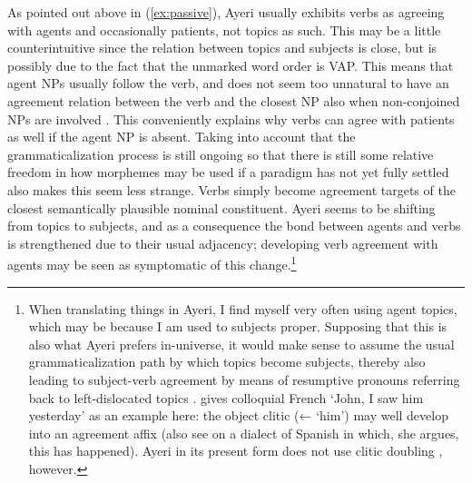 As pointed out above in (\ref{ex:passive}), Ayeri usually exhibits verbs as
agreeing with agents and occasionally patients, not topics as such. This may
be a little counterintuitive since the relation between topics and subjects is
close, but is possibly due to the fact that the unmarked word order is VAP.
This means that agent NPs usually follow the verb, and does not seem too
unnatural to have an agreement relation between the verb and the closest NP
also when non-conjoined NPs are involved \citep[180]{corbett2006}. This
conveniently explains why verbs can agree with patients as well if the agent
NP is absent. Taking into account that the grammaticalization process is still
ongoing so that there is still some relative freedom in how morphemes may be
used if a paradigm has not yet fully settled \citep[148--150]{lehmann2015}
also makes this seem less strange. Verbs simply become agreement targets of
the closest semantically plausible nominal constituent. Ayeri seems to be
shifting from topics to subjects, and as a consequence the bond between agents
and verbs is strengthened due to their usual adjacency; developing verb
agreement with agents may be seen as symptomatic of this change.\footnote{When
translating things in Ayeri, I find myself very often using agent topics,
which may be because I am used to subjects proper. Supposing that this is also
what Ayeri prefers in-universe, it would make sense to assume the usual
grammaticalization path by which topics become subjects, thereby also leading
to subject-verb agreement by means of resumptive pronouns referring back to
left-dislocated topics 
\parencites[121--122]{lehmann2015}[499--500]{vangelderen2011}.
\citet[120]{lehmann2015} gives colloquial French 
`John, I saw him yesterday' as an example here: the object clitic  (←
 `him') may well develop into an agreement affix (also see
\citet[498]{vangelderen2011} on a dialect of Spanish in which, she argues,
this has happened). Ayeri in its present form does not use clitic doubling
\citep[153--161]{spencerluis2012}, however.}

